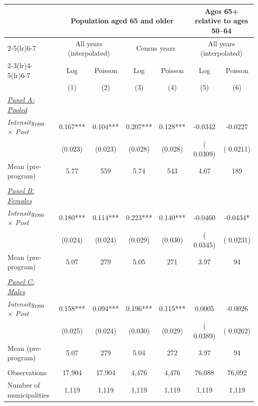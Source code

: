 \begin{tabular}{lcc@{\hskip 10pt}cc@{\hskip 10pt}cc} \hline \hline
& \multicolumn{4}{c}{Population aged 65 and older} & \multicolumn{2}{c}{Ages 65+ relative to ages 50--64} \\ \cmidrule(lr){2-5}\cmidrule(lr){6-7}
& \multicolumn{2}{c}{All years (interpolated)} & \multicolumn{2}{c}{Census years} & \multicolumn{2}{c}{All years (interpolated)} \\ \cmidrule(lr){2-3}\cmidrule(lr){4-5}\cmidrule(lr){6-7}
& \multicolumn{1}{c}{Log} & \multicolumn{1}{c}{Poisson} & \multicolumn{1}{c}{Log} & \multicolumn{1}{c}{Poisson} & \multicolumn{1}{c}{Log} & \multicolumn{1}{c}{Poisson} \\ 
& \multicolumn{1}{c}{(1)} & \multicolumn{1}{c}{(2)} & \multicolumn{1}{c}{(3)} & \multicolumn{1}{c}{(4)} & \multicolumn{1}{c}{(5)} & \multicolumn{1}{c}{(6)} \\ \toprule
\underline{\textit{Panel A: Pooled}} \\ 
\textit{Intensity$_{1999}$ $\times$ Post} & 0.167*** & 0.104*** & 0.207*** & 0.128*** &      -0.0342 &      -0.0227 \\ 
 & (0.023) & (0.023) & (0.028) & (0.028) & (      0.0309) & (      0.0211) \\ 
Mean (pre-program) & 5.77 & 559 & 5.74 & 543 &         4.67 &          189 \\ 
  & & & & & & \\ 
\underline{\textit{Panel B: Females}} \\ 
\textit{Intensity$_{1999}$ $\times$ Post} & 0.180*** & 0.114*** & 0.223*** & 0.140*** &      -0.0460 &      -0.0434* \\ 
 & (0.024) & (0.024) & (0.029) & (0.030) & (      0.0345) & (      0.0231) \\ 
Mean (pre-program) & 5.07 & 279 & 5.05 & 271 &         3.97 &           94 \\ 
  & & & & & & \\ 
\underline{\textit{Panel C: Males}} \\ 
\textit{Intensity$_{1999}$ $\times$ Post} & 0.158*** & 0.094*** & 0.196*** & 0.115*** &       0.0005 &      -0.0026 \\ 
 & (0.025) & (0.024) & (0.030) & (0.029) & (      0.0389) & (      0.0262) \\ 
Mean (pre-program) & 5.07 & 279 & 5.04 & 272 &         3.97 &           94 \\ 
  & & & & & & \\ 
Observations & 17,904 & 17,904 & 4,476 & 4,476 &       76,088 &       76,092 \\ 
Number of municipalities & 1,119 & 1,119 & 1,119 & 1,119 &        1,119 &        1,119 \\ 
\bottomrule
\end{tabular}
